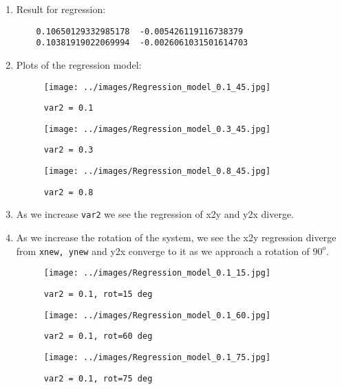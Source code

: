 \begin{enumerate}
\item Result for regression:
  \begin{lstlisting}
    0.10650129332985178  -0.005426119116738379
    0.10381919022069994  -0.0026061031501614703
  \end{lstlisting}
\item Plots of the regression model:
  \begin{figure}[h]
      \centering
      \begin{minipage}{0.31\textwidth}
          \centering
	  \texttt{[image: ../images/Regression\_model\_0.1\_45.jpg]}
          \caption{\texttt{var2 = 0.1}}
      \end{minipage}
      \hfill
      \begin{minipage}{0.31\textwidth}
          \centering
	  \texttt{[image: ../images/Regression\_model\_0.3\_45.jpg]}
          \caption{\texttt{var2 = 0.3}}
      \end{minipage}
      \hfill
      \begin{minipage}{0.31\textwidth}
          \centering
	  \texttt{[image: ../images/Regression\_model\_0.8\_45.jpg]}
          \caption{\texttt{var2 = 0.8}}
      \end{minipage}
  \end{figure}
\item As we increase \texttt{var2} we see the regression of x2y and y2x diverge.
\item As we increase the rotation of the system, we see the x2y regression diverge from \texttt{xnew, ynew} and y2x converge to it as we approach a rotation of $90^o$.
  \begin{figure}[h]
      \centering
      \begin{minipage}{0.31\textwidth}
          \centering
	  \texttt{[image: ../images/Regression\_model\_0.1\_15.jpg]}
          \caption{\texttt{var2 = 0.1, rot=15 deg}}
      \end{minipage}
      \hfill
      \begin{minipage}{0.31\textwidth}
          \centering
	  \texttt{[image: ../images/Regression\_model\_0.1\_60.jpg]}
          \caption{\texttt{var2 = 0.1, rot=60 deg}}
      \end{minipage}
      \hfill
      \begin{minipage}{0.31\textwidth}
          \centering
	  \texttt{[image: ../images/Regression\_model\_0.1\_75.jpg]}
          \caption{\texttt{var2 = 0.1, rot=75 deg}}
      \end{minipage}
  \end{figure}
\end{enumerate}
